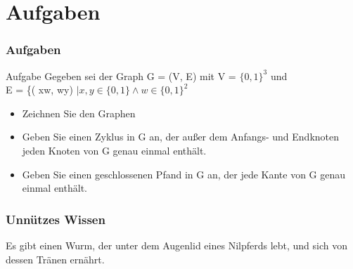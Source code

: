 \documentclass{beamer}
\begin{document}
\section{Aufgaben}

\begin{frame}
	\frametitle{Aufgaben}
	\begin{block} {Aufgabe}
		Gegeben sei der Graph G = (V, E) mit V = $\{0, 1\}^3$ und \\
		E = \{( xw, wy) $\mid x, y \in \{0, 1\} \land w \in \{0, 1\}^2$
		\begin{itemize}
			\item Zeichnen Sie den Graphen
			\item Geben Sie einen Zyklus in G an, der au{\ss}er dem Anfangs- und Endknoten jeden Knoten von G genau 					einmal enth\"alt.
			\item Geben Sie einen geschlossenen Pfand in G an, der jede Kante von G genau einmal enth\"alt.
		\end{itemize}
	\end{block}
\end{frame}

\begin{frame}
	\frametitle{Unnützes Wissen}
	\begin{center}
		Es gibt einen Wurm, der unter dem Augenlid eines Nilpferds lebt, und sich von dessen Tränen ernährt.
	\end{center}
\end{frame}
\end{document}
